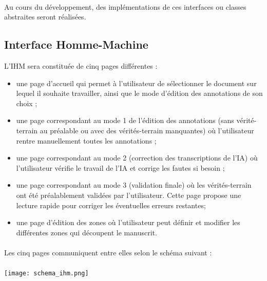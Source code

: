 \paragraph{}
Au cours du développement, des implémentations de ces interfaces ou classes abstraites seront réalisées.

\subsection{Interface Homme-Machine}

L’IHM sera constituée de cinq pages différentes :
\begin{itemize}
	\item une page d’accueil qui permet à l’utilisateur de sélectionner le document sur lequel il souhaite travailler, ainsi que le mode d’édition des annotations de son choix ;
	\item une page correspondant au mode 1 de l’édition des annotations (sans vérité-terrain au préalable ou avec des vérités-terrain manquantes) où l’utilisateur rentre manuellement toutes les annotations ;
	\item une page correspondant au mode 2 (correction des transcriptions de l’IA) où l’utilisateur vérifie le travail de l’IA et corrige les fautes si besoin ;
	\item une page correspondant au mode 3 (validation finale) où les vérités-terrain ont été préalablement validées par l’utilisateur. Cette page propose une lecture rapide pour corriger les éventuelles erreurs restantes;
	\item une page d’édition des zones où l’utilisateur peut définir et modifier les différentes zones qui découpent le manuscrit.
\end{itemize}

\paragraph{}
Les cinq pages communiquent entre elles selon le schéma suivant :

\paragraph{}
\begin{mdframed}[frametitle={Figure 10 : Organisation de l'IHM}, innerbottommargin=10]
\begin{center}
\texttt{[image: schema\_ihm.png]}
\end{center}
\end{mdframed}

